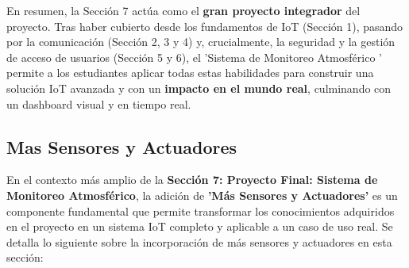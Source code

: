 \documentclass{report}
\begin{document}
En resumen, la Sección 7 actúa como el \textbf{gran proyecto integrador} del proyecto. Tras haber cubierto desde los fundamentos de IoT (Sección 1), 
pasando por la comunicación (Sección 2, 3 y 4) y, crucialmente, la seguridad y la gestión de acceso de usuarios (Sección 5 y 6), el  'Sistema de 
Monitoreo Atmosférico ' permite a los estudiantes aplicar todas estas habilidades para construir una solución IoT avanzada y con un \textbf{impacto 
en el mundo real}, culminando con un dashboard visual y en tiempo real.

\subsection{Mas Sensores y Actuadores}
En el contexto más amplio de la \textbf{Sección 7: Proyecto Final: Sistema de Monitoreo Atmosférico}, la adición de \textbf{ 'Más Sensores y Actuadores'} 
es un componente fundamental que permite transformar los conocimientos adquiridos en el proyecto en un sistema IoT completo y aplicable a un caso de uso real. 
Se detalla lo siguiente sobre la incorporación de más sensores y actuadores en esta sección:
\end{document}
